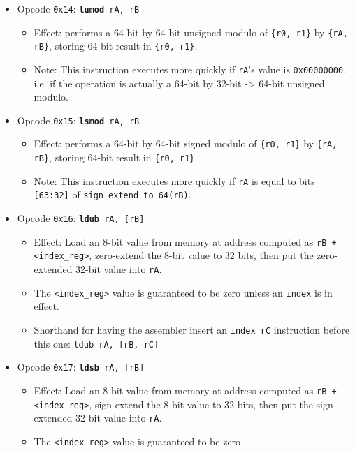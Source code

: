 \documentclass{article}
\begin{document}
\begin{itemize}
	\item Opcode \texttt{0x14}:
		\texttt{\textbf{lumod} rA, rB}
		\begin{itemize}
		\item Effect: performs a 64-bit by 64-bit unsigned modulo of
		\texttt{\{r0, r1\}} by \texttt{\{rA, rB\}}, storing 64-bit
		result in \texttt{\{r0, r1\}}.
		\item Note: This instruction executes more quickly if
		\texttt{rA}'s value is \texttt{0x00000000}, i.e. if the
		operation is actually a 64-bit by 32-bit -> 64-bit unsigned
		modulo.
		\end{itemize}
	\item Opcode \texttt{0x15}:
		\texttt{\textbf{lsmod} rA, rB}
		\begin{itemize}
		\item Effect: performs a 64-bit by 64-bit signed modulo of
		\texttt{\{r0, r1\}} by \texttt{\{rA, rB\}}, storing 64-bit
		result in \texttt{\{r0, r1\}}.
		\item Note: This instruction executes more quickly if
		\texttt{rA} is equal to bits \texttt{[63:32]} of
		\texttt{sign\_extend\_to\_64(rB)}.
		\end{itemize}
	\item Opcode \texttt{0x16}:
		\texttt{\textbf{ldub} rA, [rB]}
		\begin{itemize}
		\item Effect: Load an 8-bit value from memory at address
		computed as \texttt{rB + <index\_reg>}, zero-extend
		the 8-bit value to 32 bits, then put the zero-extended 32-bit
		value into \texttt{rA}.
		\item The \texttt{<index\_reg>} value is guaranteed to be zero
		unless an \texttt{index} is in effect.
		\item Shorthand for having the assembler insert an
		\texttt{index rC} instruction before this one:
			\texttt{ldub rA, [rB, rC]}
		\end{itemize}
	\item Opcode \texttt{0x17}:
		\texttt{\textbf{ldsb} rA, [rB]}
		\begin{itemize}
		\item Effect: Load an 8-bit value from memory at address
		computed as \texttt{rB + <index\_reg>}, sign-extend
		the 8-bit value to 32 bits, then put the sign-extended 32-bit
		value into \texttt{rA}.
		\item The \texttt{<index\_reg>} value is guaranteed to be zero

\end{itemize}
\end{itemize}
\end{document}
